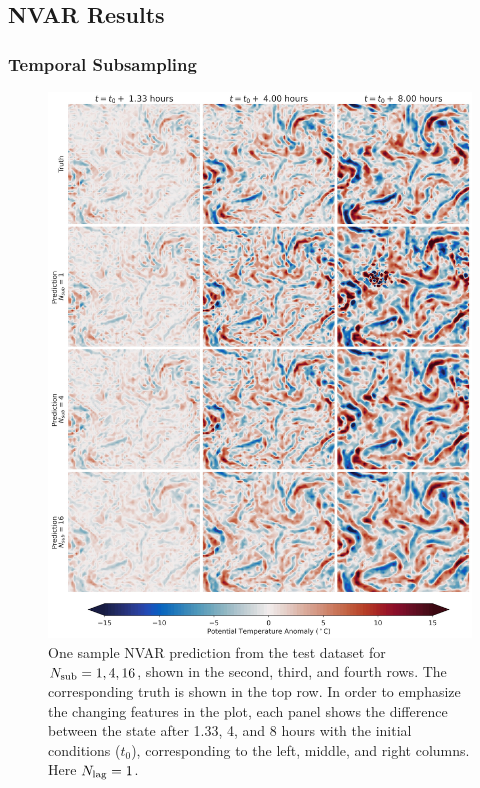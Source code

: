 \subsection{NVAR Results}
\label{subsec:nvar-results}


\subsubsection{Temporal Subsampling}


\begin{figure}
    \centering
    \includegraphics[width=\textwidth]{../figures/nvar_big_plot.jpg}
    \caption{One sample NVAR prediction from the test dataset for $N_\text{sub} =
        1,4,16$, shown in the second, third, and fourth rows.
        The corresponding truth is shown in the top row.
        In order to emphasize the changing features in the plot, each panel
        shows the difference between the state after 1.33, 4, and 8 hours with
        the initial conditions ($t_0$), corresponding to the left, middle, and
        right columns.
        Here $N_\text{lag}=1$.
    }
    \label{fig:nvar_qualitative}
\end{figure}

